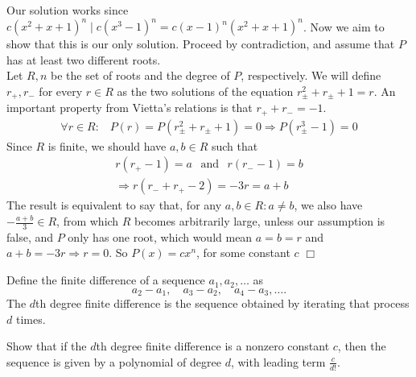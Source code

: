 \begin{solution}[$P(x) = cx^n$ for an arbitrary constant $c$ and some positive integer $n$]
    Our solution works since $c(x^2+x+1)^n \mid c (x^3-1)^n = c(x-1)^n(x^2+x+1)^n$. Now we aim to show that this is our only solution. Proceed by contradiction, and assume that $P$ has at least two different roots. \\[3mm]
    Let $R,n$ be the set of roots and the degree of $P$, respectively. We will define $r_+,r_-$ for every $r \in R$ as the two solutions of the equation $r_{\pm}^2 + r_{\pm}+1 = r$. An important property from Vietta's relations is that $r_+ + r_- = -1$. 
    \begin{align*}
        \forall r \in R: \hspace{10pt} P(r) = P(r_{\pm}^2 + r_{\pm}+1) = 0 \Rightarrow P(r_{\pm}^3 - 1) = 0 
    \end{align*}
    Since $R$ is finite, we should have $a,b \in R$ such that 
    \begin{align*}
        r(r_+-1) = a \hspace{5pt} \text{ and } \hspace{5pt} r(r_--1)=b \\
        \Rightarrow r(r_- + r_+ - 2) = -3r = a + b \hspace{7pt} 
    \end{align*}
    The result is equivalent to say that, for any $a,b \in R: a\neq b$, we also have $-\frac{a+b}{3} \in R$, from which $R$ becomes arbitrarily large, unless our assumption is false, and $P$ only has one root, which would mean $a=b=r$ and $a+b = -3r \Rightarrow r=0$. So $P(x)=cx^n$, for some constant $c$ $\Box$  
\end{solution}

\begin{problem}
    Define the finite difference of a sequence \( a_1, a_2, \dots \) as  
\[
a_2 - a_1, \quad a_3 - a_2, \quad a_4 - a_3, \dots.
\]
The \( d \)th degree finite difference is the sequence obtained by iterating that process \( d \) times. 

Show that if the \( d \)th degree finite difference is a nonzero constant \( c \), then the sequence is given by a polynomial of degree \( d \), with leading term \( \frac{c}{d!} \).
\end{problem}

